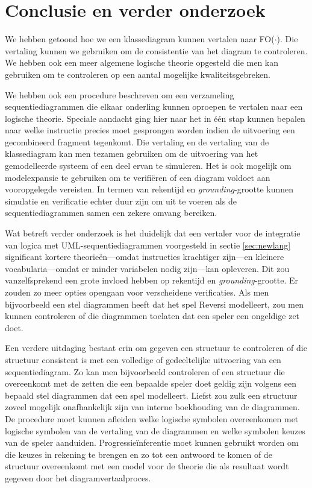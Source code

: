\chapter{Conclusie en verder onderzoek}\label{sec:conclusie}
We hebben getoond hoe we een klassediagram kunnen vertalen naar FO($\cdot$). Die vertaling kunnen we gebruiken om de consistentie van het diagram te controleren. We hebben ook een meer algemene logische theorie opgesteld die men kan gebruiken om te controleren op een aantal mogelijke kwaliteitsgebreken.

We hebben ook een procedure beschreven om een verzameling sequentiediagrammen die elkaar onderling kunnen oproepen te vertalen naar een logische theorie. Speciale aandacht ging hier naar het in \'e\'en stap kunnen bepalen naar welke instructie precies moet gesprongen worden indien de uitvoering een gecombineerd fragment tegenkomt. Die vertaling en de vertaling van de klassediagram kan men tezamen gebruiken om de uitvoering van het gemodelleerde systeem of een deel ervan te simuleren. Het is ook mogelijk om modelexpansie te gebruiken om te verifi\"eren of een diagram voldoet aan vooropgelegde vereisten. In termen van rekentijd en \textit{grounding}-grootte kunnen simulatie en verificatie echter duur zijn om uit te voeren als de sequentiediagrammen samen een zekere omvang bereiken.

Wat betreft verder onderzoek is het duidelijk dat een vertaler voor de integratie van logica met UML-sequentiediagrammen voorgesteld in sectie \ref{sec:newlang} significant kortere theorie\"en---omdat instructies krachtiger zijn---en kleinere vocabularia---omdat er minder variabelen nodig zijn---kan opleveren. Dit zou vanzelfsprekend een grote invloed hebben op rekentijd en \textit{grounding}-grootte. Er zouden zo meer opties opengaan voor verscheidene verificaties. Als men bijvoorbeeld een stel diagrammen heeft dat het spel Reversi modelleert, zou men kunnen controleren of die diagrammen toelaten dat een speler een ongeldige zet doet.

Een verdere uitdaging bestaat erin om gegeven een structuur te controleren of die structuur consistent is met een volledige of gedeeltelijke uitvoering van een sequentiediagram. Zo kan men bijvoorbeeld controleren of een structuur die overeenkomt met de zetten die een bepaalde speler doet geldig zijn volgens een bepaald stel diagrammen dat een spel modelleert. Liefst zou zulk een structuur zoveel mogelijk onafhankelijk zijn van interne boekhouding van de diagrammen. De procedure moet kunnen afleiden welke logische symbolen overeenkomen met logische symbolen van de vertaling van de diagrammen en welke symbolen keuzes van de speler aanduiden. Progressie\"inferentie moet kunnen gebruikt worden om die keuzes in rekening te brengen en zo tot een antwoord te komen of de structuur overeenkomt met een model voor de theorie die als resultaat wordt gegeven door het diagramvertaalproces.